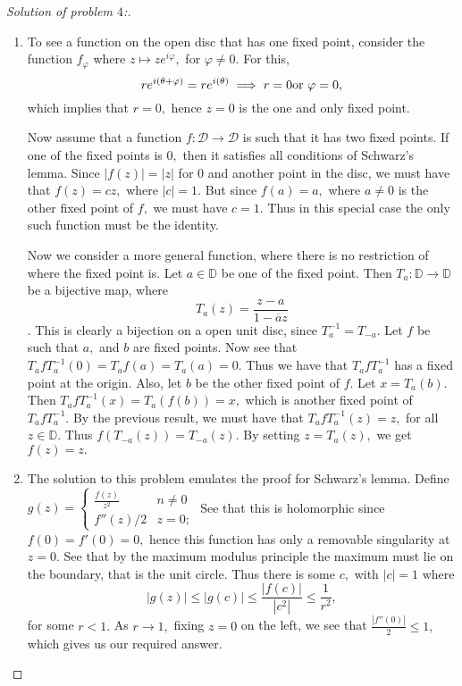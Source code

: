 \documentclass[letterpaper,11pt,twoside]{article}
\theoremstyle{proposition}
\theoremstyle{definition}
\theoremstyle{theorem}
\theoremstyle{definition}
\theoremstyle{definition}
\theoremstyle{definition}
\theoremstyle{lemma}
\theoremstyle{definition}
\theoremstyle{definition}
\theoremstyle{corollary}
\theoremstyle{definition}
\theoremstyle{definition}
\theoremstyle{definition}
\newcommand{\abs}[1]{\left \vert #1 \right \vert}
\newcommand{\type}[1]{\text{\rm #1}}
\begin{document}
	\begin{proof}[Solution of problem $4$:]
	\begin{enumerate}
		\item To see a function on the open disc that has one fixed point, consider the function $f_{\varphi}$ where $z \mapsto ze^{i\varphi},$ for $\varphi 
		\neq 0.$ For this, $$re^{i(\theta+ \varphi)} = re^{i(\theta)} \implies r=0 \type{ or } \varphi=0,$$ which implies that $r=0,$ hence $z=0$ is the one 
		and only fixed point. 
		
		Now assume that a function $f: \mathcal{D} \to \mathcal{D}$ is such that it has two fixed points. If one of the fixed points is $0,$ then it 
		satisfies all conditions of Schwarz's lemma. Since $\abs{f(z)}= \abs{z}$ for $0$ and another point in the disc, we must have that $f(z)=cz,$ where 
		$\abs{c}=1.$ But since $f(a)=a,$ where $a \neq 0$ is the other fixed point of $f,$ we must have $c=1.$ Thus in this special case the only such 
		function must be the identity. 
		
		Now we consider a more general function, where there is no restriction of where the fixed point is. Let $a \in \mathbb{D}$ be one of the fixed 
		point. Then $T_a: \mathbb{D} \to \mathbb{D}$ be a bijective map, where $$T_a(z)= \frac{z-a}{1- \overline{a}z}$$. This is clearly a bijection on a 
		open unit disc, since $T_a^{-1}=T_{-a}.$ Let $f$ be such that $a,$ and $b$ are fixed points. Now see that $T_afT^{-1}_a(0)=T_af(a)=T_a(a)=0.$ Thus 
		we have that $T_afT^{-1}_a$ has a fixed point at the origin. Also, let $b$ be the other fixed point of $f.$ Let $x=T_a(b).$ Then 
		$T_afT^{-1}_a(x)=T_a(f(b))=x,$ which is another fixed point of $T_afT^{-1}_a.$ By the previous result, we must have that $T_afT^{-1}_a(z)=z,$ for 
		all $z \in \mathbb{D}.$ Thus $f(T_{-a}(z))=T_{-a}(z).$ By setting $z=T_a(z),$ we get $f(z)=z.$
		\item The solution to this problem emulates the proof for Schwarz's lemma. Define $g(z)= \begin{cases}
			\frac{f(z)}{z^2} & n \neq 0\\
			        f''(z)/2 & z=0;
		\end{cases}$
	See that this is holomorphic since $f(0)=f'(0)=0,$ hence this function has only a removable singularity at $z=0.$ See that by the maximum modulus 
	principle the maximum must lie on the boundary, that is the unit circle. Thus there is some $c,$ with $\abs{c}=1$ where $$\abs{g(z)} \leq \abs{g(c)} 
	\leq \frac{\abs{f(c)}}{\abs{c^2}} \leq \frac{1}{r^2},$$ for some $r<1.$ As $r \to 1,$ fixing $z=0$ on the left, we see that $\frac{\abs{f''(0)}}{2} \leq 
	1,$ which gives us our required answer. 
	

\end{enumerate}
\end{proof}
\end{document}
